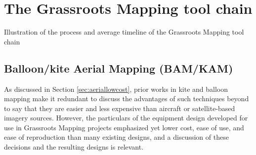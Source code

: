 \documentclass[11pt]{report}
\begin{document}
\chapter{The Grassroots Mapping tool chain}
\label{chap:toolchain}
Illustration of the process and average timeline of the Grassroots Mapping tool chain

\section{Balloon/kite Aerial Mapping (BAM/KAM)}

As discussed in Section \ref{sec:aeriallowcost}, prior works in kite and balloon mapping make it redundant to discuss the advantages of such techniques beyond to say that they are easier and less expensive than aircraft or satellite-based imagery sources. However, the particulars of the equipment design developed for use in Grassroots Mapping projects emphasized yet lower cost, ease of use, and ease of reproduction than many existing designs, and a discussion of these decisions and the resulting designs is relevant. 
\end{document}
